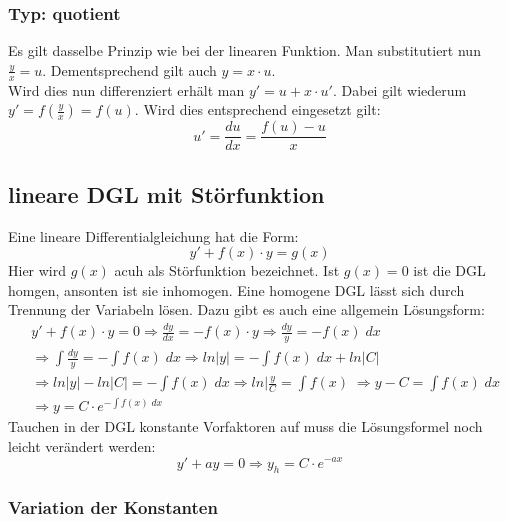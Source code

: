 \documentclass[a4paper,10pt]{scrartcl}
\begin{document}
        \subsubsection{Typ: quotient}
        Es gilt dasselbe Prinzip wie bei der linearen Funktion. Man substitutiert nun \(\frac{y}{x} = u\). Dementsprechend gilt auch \(y = x \cdot u\). \\
        Wird dies nun differenziert erhält man \(y' = u + x \cdot u'\). Dabei gilt wiederum\(y' = f(\frac{y}{x}) = f(u)\). Wird dies entsprechend eingesetzt gilt:
        \begin{equation}
            u' = \frac{du}{dx} = \frac{f(u) - u}{x}     
        \end{equation} 

        \subsection{lineare DGL mit Störfunktion}
        Eine lineare Differentialgleichung hat die Form: 
        \begin{equation}
            y' + f(x) \cdot y = g(x)
        \end{equation}
        Hier wird \(g(x)\) acuh als Störfunktion bezeichnet. Ist \(g(x) = 0\) ist die DGL homgen, ansonten ist sie inhomogen. Eine homogene DGL lässt sich 
        durch Trennung der Variabeln lösen. Dazu gibt es auch eine allgemein Lösungsform:
        \begin{equation}    
            \begin{aligned}
                & y' + f(x) \cdot y = 0 \Rightarrow \frac{dy}{dx} = -f(x) \cdot y \Rightarrow \frac{dy}{y} = -f(x) \; dx\\
                & \Rightarrow \int \frac{dy}{y} = - \int f(x) \; dx \Rightarrow ln|y| = - \int f(x) \; dx + ln|C| \\
                & \Rightarrow ln |y| - ln|C| = - \int f(x) \; dx \Rightarrow ln|\frac{y}{C} = \int f(x) \; \Rightarrow y - C = \int f(x) \; dx \\
                & \Rightarrow y = C \cdot e^{- \int f(x) \; dx}    
            \end{aligned}
        \end{equation}  
        Tauchen in der DGL konstante Vorfaktoren auf muss die Lösungsformel noch leicht verändert werden:
        \begin{equation}
            y' + ay = 0 \Rightarrow y_h = C \cdot e^{-ax}
        \end{equation}
        \subsubsection{Variation der Konstanten}
\end{document}
